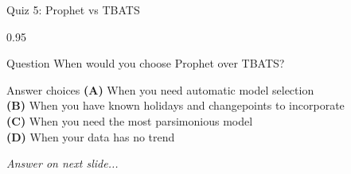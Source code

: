 \documentclass[9pt, aspectratio=169, t]{beamer}
\begin{document}
\begin{frame}{Quiz 5: Prophet vs TBATS}
    \begin{cminipage}{0.95\textwidth}
    \begin{alertblock}{Question}
        When would you choose Prophet over TBATS?
    \end{alertblock}

    \vspace{0.4cm}

    \begin{block}{Answer choices}
        \textcolor{MainBlue}{\textbf{(A)}} When you need automatic model selection\\[3pt]
        \textcolor{MainBlue}{\textbf{(B)}} When you have known holidays and changepoints to incorporate\\[3pt]
        \textcolor{MainBlue}{\textbf{(C)}} When you need the most parsimonious model\\[3pt]
        \textcolor{MainBlue}{\textbf{(D)}} When your data has no trend
    \end{block}

    \vspace{0.5cm}

    \begin{center}
        \textit{Answer on next slide...}
    \end{center}
    \end{cminipage}
\end{frame}
\end{document}
